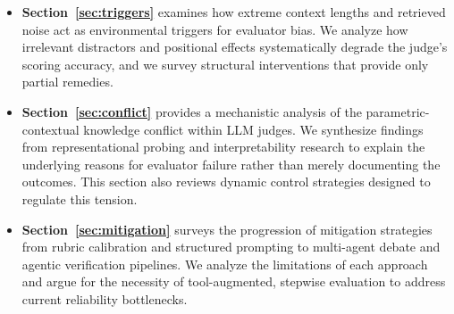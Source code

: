 \begin{itemize}    
\item \textbf{Section~\ref{sec:triggers}} examines how extreme context lengths and retrieved noise act as environmental triggers for evaluator bias. We analyze how irrelevant distractors and positional effects systematically degrade the judge's scoring accuracy, and we survey structural interventions that provide only partial remedies.    
\item \textbf{Section~\ref{sec:conflict}} provides a mechanistic analysis of the parametric-contextual knowledge conflict within LLM judges. We synthesize findings from representational probing and interpretability research to explain the underlying reasons for evaluator failure rather than merely documenting the outcomes. This section also reviews dynamic control strategies designed to regulate this tension.    
\item \textbf{Section~\ref{sec:mitigation}} surveys the progression of mitigation strategies from rubric calibration and structured prompting to multi-agent debate and agentic verification pipelines. We analyze the limitations of each approach and argue for the necessity of tool-augmented, stepwise evaluation to address current reliability bottlenecks.
\end{itemize}